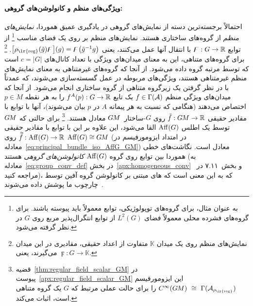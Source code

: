 \paragraph{ویژگی‌های منظم و کانولوشن‌های گروهی:}
احتمالاً برجسته‌ترین دسته از نمایش‌های گروهی در یادگیری عمیق هموردا، \emph{نمایش‌های منظم} از گروه‌های ساختاری هستند.
نمایش‌های منظم بر روی یک فضای مناسب%
\footnote{
	به عنوان مثال، برای گروه‌های توپولوژیکی، توابع معمولاً باید پیوسته باشند.
	برای گروه‌های فشرده محلی معمولاً فضای $L^2(G)$ از توابع انتگرال‌پذیر مربع روی $G$ در نظر گرفته می‌شود.
}
از توابع $\digamma: G \to \mathbb{R}$ با انتقال آنها عمل می‌کنند، یعنی
$\big[ \rho_\textup{\lr{reg}} (\tilde{g}) \digamma \big](g) = \digamma\big( \tilde{g}^{-1}g \big)$.%
\footnote{
	نمایش‌های منظم روی یک میدان $\mathbb{K}$ متفاوت از اعداد حقیقی، مقادیری در این میدان می‌گیرند، یعنی $\digamma: G \to \mathbb{K}$.
}
برای گروه‌های متناهی، این به معنای میدان‌های ویژگی با تعداد کانال‌های $c = |G|$ است که توسط مرتبه گروه داده می‌شود.
از آنجا که گروه‌های غیرمتناهی به معنای نمایش‌های منظم غیرمتناهی هستند، ویژگی‌های مربوطه در عمل گسسته‌سازی می‌شوند، که عمدتاً با در نظر گرفتن یک زیرگروه متناهی از گروه ساختاری انجام می‌شود.
از آنجا که میدان‌های ویژگی منظم $f \in \Gamma(\mathcal{A})$ یک تابع $f^A(p): G \to \mathbb{R}$ را به هر نقطه $p\in M$ اختصاص می‌دهند (هنگامی که نسبت به هر پیمانه $A$ در $p$ بیان می‌شوند)، آنها با توابع با مقادیر حقیقی $\tilde{f}: G\mkern-1.4muM \to \mathbb{R}$ روی $G$-ساختار~$G\mkern-1.4muM$ معادل هستند.%
\footnote{
	قضیه~\ref{thm:regular_field_scalar_GM} در پیوست~\ref{apx:regular_field_scalar_GM} این ایزومورفیسم
	$C^\infty(\GM)\ \cong\ \Gamma(\A_{\rho_\textup{\lr{reg}}})$
	را برای حالت عملی مرتبط که $G$ یک گروه متناهی است، اثبات می‌کند.
}
برای حالتی که $G\mkern-1.4muM$ توسط یک اطلس $\operatorname{Aff}(G)$ القا می‌شود، این علاوه بر این با توابع با مقادیر حقیقی $\accentset{\approx}{f}: \operatorname{Aff}(G) \to \mathbb{R}$ روی $\operatorname{Aff}(G) \cong G\mkern-1.4muM$ (در امتداد ایزومورفیسم در معادله~\eqref{eq:principal_bundle_iso_AffG_GM}) معادل است.
نگاشت‌های خطی هموردا بین توابع روی گروه $\operatorname{Aff}(G)$ \emph{کانولوشن‌های گروهی} هستند (به معادله~\eqref{eq:group_conv_def} در بخش~\ref{apx:homogeneous_conv} و بخش~۷.۱۱ در~\cite{gallier2019harmonicRepr} مراجعه کنید)، که به این معنی است که های مبتنی بر کانولوشن گروه آفين توسط چارچوب ما پوشش داده می‌شوند~\cite{Cohen2016-GCNN,Kondor2018-GENERAL,bekkers2020bspline}.


